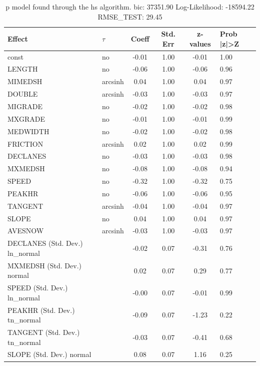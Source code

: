\begin{table}
	\caption{p model found through the hs algorithm. bic: 37351.90 Log-Likelihood: -18594.22 RMSE_TEST: 29.45}
	\begin{center}
		\begin{tabular}{|l|l|c|c|c|l|}
			\hline
			Effect & $\tau$ & Coeff & Std. Err & z-values & Prob |z|>Z \\
			\hline
			const & no & -0.01 & 1.00 & -0.01 & 1.00 \\
			\hline
			LENGTH & no & -0.06 & 1.00 & -0.06 & 0.96 \\
			\hline
			MIMEDSH & arcsinh & 0.04 & 1.00 & 0.04 & 0.97 \\
			\hline
			DOUBLE & arcsinh & -0.03 & 1.00 & -0.03 & 0.97 \\
			\hline
			MIGRADE & no & -0.02 & 1.00 & -0.02 & 0.98 \\
			\hline
			MXGRADE & no & -0.01 & 1.00 & -0.01 & 0.99 \\
			\hline
			MEDWIDTH & no & -0.02 & 1.00 & -0.02 & 0.98 \\
			\hline
			FRICTION & arcsinh & 0.02 & 1.00 & 0.02 & 0.99 \\
			\hline
			DECLANES & no & -0.03 & 1.00 & -0.03 & 0.98 \\
			\hline
			MXMEDSH & no & -0.08 & 1.00 & -0.08 & 0.94 \\
			\hline
			SPEED & no & -0.32 & 1.00 & -0.32 & 0.75 \\
			\hline
			PEAKHR & no & -0.06 & 1.00 & -0.06 & 0.95 \\
			\hline
			TANGENT & arcsinh & -0.04 & 1.00 & -0.04 & 0.97 \\
			\hline
			SLOPE & no & 0.04 & 1.00 & 0.04 & 0.97 \\
			\hline
			AVESNOW & arcsinh & -0.03 & 1.00 & -0.03 & 0.97 \\
			\hline
			DECLANES (Std. Dev.) ln_normal &  & -0.02 & 0.07 & -0.31 & 0.76 \\
			\hline
			MXMEDSH (Std. Dev.) normal &  & 0.02 & 0.07 & 0.29 & 0.77 \\
			\hline
			SPEED (Std. Dev.) ln_normal &  & -0.00 & 0.07 & -0.01 & 0.99 \\
			\hline
			PEAKHR (Std. Dev.) tn_normal &  & -0.09 & 0.07 & -1.23 & 0.22 \\
			\hline
			TANGENT (Std. Dev.) tn_normal &  & -0.03 & 0.07 & -0.41 & 0.68 \\
			\hline
			SLOPE (Std. Dev.) normal &  & 0.08 & 0.07 & 1.16 & 0.25 \\

\end{tabular}
\end{center}
\end{table}
